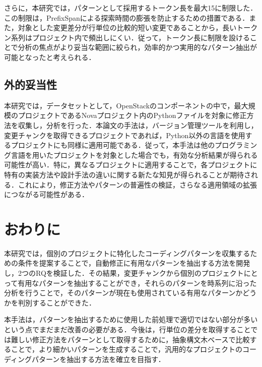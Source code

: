 \documentclass[submit,techrep,noauthor]{ipsj}
\begin{document}
さらに，本研究では，パターンとして採用するトークン長を最大15に制限した．この制限は，PrefixSpanによる探索時間の膨張を防止するための措置である．また，対象とした変更差分が行単位の比較的短い変更であることから，長いトークン系列はプロジェクト内で頻出しにくい．従って，トークン長に制限を設けることで分析の焦点がより妥当な範囲に絞られ，効率的かつ実用的なパターン抽出が可能となったと考えられる．
\subsection{外的妥当性}
本研究では，データセットとして，OpenStackのコンポーネントの中で，最大規模のプロジェクトであるNovaプロジェクト内のPythonファイルを対象に修正方法を収集し，分析を行った．本論文の手法は，バージョン管理ツールを利用し，変更チャンクを取得できるプロジェクトであれば，Python以外の言語を使用するプロジェクトにも同様に適用可能である．従って，本手法は他のプログラミング言語を用いたプロジェクトを対象とした場合でも，有効な分析結果が得られる可能性が高い．特に，異なるプロジェクトに適用することで，各プロジェクトに特有の実装方法や設計手法の違いに関する新たな知見が得られることが期待される．これにより，修正方法やパターンの普遍性の検証，さらなる適用領域の拡張につながる可能性がある．
\section{おわりに}
本研究では，個別のプロジェクトに特化したコーディングパターンを収集するための条件を提案することで，自動修正に有用なパターンを抽出する方法を開発し，2つのRQを検証した．その結果，変更チャンクから個別のプロジェクトにとって有用なパターンを抽出することができ，それらのパターンを時系列に沿った分析を行うことで，そのパターンが現在も使用されている有用なパターンかどうかを判別することができた．

本手法は，パターンを抽出するために使用した前処理で適切ではない部分が多いという点でまだまだ改善の必要がある．今後は，行単位の差分を取得することでは難しい修正方法をパターンとして取得するために，抽象構文木ベースで比較することで，より細かいパターンを生成することで，汎用的なプロジェクトのコーディングパターンを抽出する方法を確立を目指す．



\end{document}
